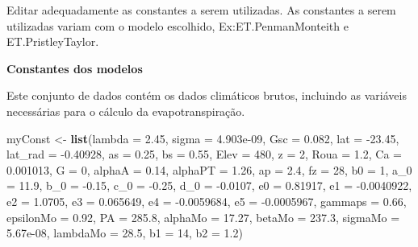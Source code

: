 \documentclass[
]{book}
\newenvironment{Shaded}{\begin{snugshade}}{\end{snugshade}}
\newcommand{\DataTypeTok}[1]{\textcolor[rgb]{0.13,0.29,0.53}{#1}}
\newcommand{\DecValTok}[1]{\textcolor[rgb]{0.00,0.00,0.81}{#1}}
\newcommand{\FloatTok}[1]{\textcolor[rgb]{0.00,0.00,0.81}{#1}}
\newcommand{\KeywordTok}[1]{\textcolor[rgb]{0.13,0.29,0.53}{\textbf{#1}}}
\newcommand{\NormalTok}[1]{#1}
\newcommand{\StringTok}[1]{\textcolor[rgb]{0.31,0.60,0.02}{#1}}
\begin{document}
Editar adequadamente as constantes a serem utilizadas. As constantes a serem utilizadas variam com o modelo escolhido, Ex:ET.PenmanMonteith e ET.PristleyTaylor.

\textbf{Constantes dos modelos}

Este conjunto de dados contém os dados climáticos brutos, incluindo as variáveis necessárias para o cálculo da evapotranspiração.

\begin{Shaded}
\begin{Highlighting}[]
\NormalTok{myConst <-}\StringTok{ }\KeywordTok{list}\NormalTok{(}\DataTypeTok{lambda =} \FloatTok{2.45}\NormalTok{, }\DataTypeTok{sigma =} \FloatTok{4.903e-09}\NormalTok{, }\DataTypeTok{Gsc =} \FloatTok{0.082}\NormalTok{, }
                \DataTypeTok{lat =} \FloatTok{-23.45}\NormalTok{, }\DataTypeTok{lat_rad =} \FloatTok{-0.40928}\NormalTok{, }\DataTypeTok{as =} \FloatTok{0.25}\NormalTok{, }
                \DataTypeTok{bs =} \FloatTok{0.55}\NormalTok{, }\DataTypeTok{Elev =} \DecValTok{480}\NormalTok{, }\DataTypeTok{z =} \DecValTok{2}\NormalTok{, }\DataTypeTok{Roua =} \FloatTok{1.2}\NormalTok{, }
                \DataTypeTok{Ca =} \FloatTok{0.001013}\NormalTok{, }\DataTypeTok{G =} \DecValTok{0}\NormalTok{, }
                \DataTypeTok{alphaA =} \FloatTok{0.14}\NormalTok{, }\DataTypeTok{alphaPT =} \FloatTok{1.26}\NormalTok{, }
                \DataTypeTok{ap =} \FloatTok{2.4}\NormalTok{, }\DataTypeTok{fz =} \DecValTok{28}\NormalTok{, }\DataTypeTok{b0 =} \DecValTok{1}\NormalTok{, }
                \DataTypeTok{a_0 =} \FloatTok{11.9}\NormalTok{, }\DataTypeTok{b_0 =} \FloatTok{-0.15}\NormalTok{, }
                \DataTypeTok{c_0 =} \FloatTok{-0.25}\NormalTok{, }\DataTypeTok{d_0 =} \FloatTok{-0.0107}\NormalTok{, }
                \DataTypeTok{e0 =} \FloatTok{0.81917}\NormalTok{,  }
                \DataTypeTok{e1 =} \FloatTok{-0.0040922}\NormalTok{, }\DataTypeTok{e2 =} \FloatTok{1.0705}\NormalTok{, }\DataTypeTok{e3 =} \FloatTok{0.065649}\NormalTok{, }
                \DataTypeTok{e4 =} \FloatTok{-0.0059684}\NormalTok{, }
                \DataTypeTok{e5 =} \FloatTok{-0.0005967}\NormalTok{, }\DataTypeTok{gammaps =} \FloatTok{0.66}\NormalTok{, }
                \DataTypeTok{epsilonMo =} \FloatTok{0.92}\NormalTok{, }\DataTypeTok{PA =} \FloatTok{285.8}\NormalTok{, }
                \DataTypeTok{alphaMo =} \FloatTok{17.27}\NormalTok{, }\DataTypeTok{betaMo =} \FloatTok{237.3}\NormalTok{, }
                \DataTypeTok{sigmaMo =} \FloatTok{5.67e-08}\NormalTok{, }\DataTypeTok{lambdaMo =} \FloatTok{28.5}\NormalTok{, }
                \DataTypeTok{b1 =} \DecValTok{14}\NormalTok{, }\DataTypeTok{b2 =} \FloatTok{1.2}\NormalTok{)}
\end{Highlighting}
\end{Shaded}
\end{document}
